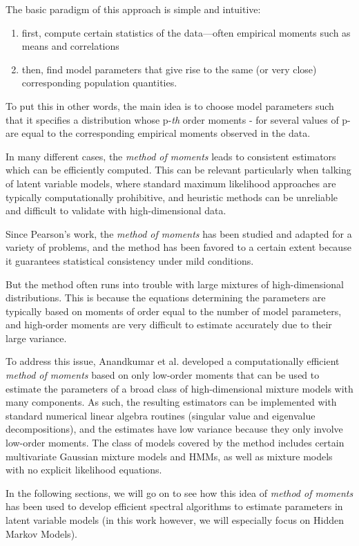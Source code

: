 The basic paradigm of this approach is simple and intuitive:
\begin{enumerate}[label=\roman*]
\item first, compute certain statistics of the data—often empirical moments such as means and correlations
\item then, find model parameters that give rise to the same (or very close) corresponding population quantities.
\end{enumerate}

To put this in other words, the main idea is to choose model parameters such that it specifies a distribution whose p-\textit{th} order moments - for several values of p- are equal to the corresponding empirical moments observed in the data.

In many different cases, the \textit{method of moments} leads to consistent estimators which can be efficiently computed. This can be relevant particularly when talking of latent variable models, where standard maximum likelihood approaches are typically computationally prohibitive, and heuristic methods can be unreliable and difficult to validate with high-dimensional data. 


Since Pearson’s work, the \textit{method of moments} has been studied
and adapted for a variety of problems, and the method has been favored to a certain extent because it guarantees statistical consistency under mild conditions.

But the method often runs into trouble with large mixtures of high-dimensional distributions. This is because the equations determining the parameters are typically based on moments of order equal to the number of model parameters, and high-order moments are very difficult to estimate accurately due to their large variance.

To address this issue, Anandkumar et al.\cite{ref6} developed a computationally efficient \textit{method of moments} based on only low-order moments that can be used to estimate the parameters of a broad class of high-dimensional mixture
models with many components. As such, the resulting estimators can be implemented with standard numerical
linear algebra routines (singular value and eigenvalue decompositions), and the estimates have
low variance because they only involve low-order moments.
The class of models covered by the method includes certain multivariate Gaussian mixture models and HMMs, as well as mixture models with no explicit likelihood equations.

In the following sections, we will go on to see how this idea of \textit{method of moments} has been used to develop efficient spectral algorithms to estimate parameters in latent variable models (in this work however, we will especially focus on Hidden Markov Models).



